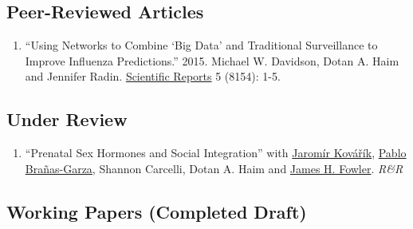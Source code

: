 \documentclass[letterpaper]{article}
\begin{document}



\subsection*{Peer-Reviewed Articles}
\begin{enumerate}
\item ``Using Networks to Combine `Big Data' and Traditional Surveillance to Improve Influenza Predictions.''  2015. Michael W. Davidson, Dotan A. Haim and Jennifer Radin.
\href{http://www.nature.com/srep/2015/150129/srep08154/full/srep08154.html}{Scientific Reports} 5 (8154): 1-5.
\end{enumerate}

\subsection*{Under Review}
\begin{enumerate}
  \item ``Prenatal Sex Hormones and Social Integration'' with \href{https://sites.google.com/site/webpagesjaromir/}{Jarom\'{i}r Kov\'{a}\v{r}\'{i}k},
\href{https://sites.google.com/site/pablobranasgarza/home}{Pablo Bra\~{n}as-Garza}, Shannon Carcelli, Dotan A. Haim and \href{jhfowler.ucsd.edu}{James H. Fowler}. \emph{R\&R} 


\end{enumerate}

\subsection*{Working Papers (Completed Draft)}
\end{document}
